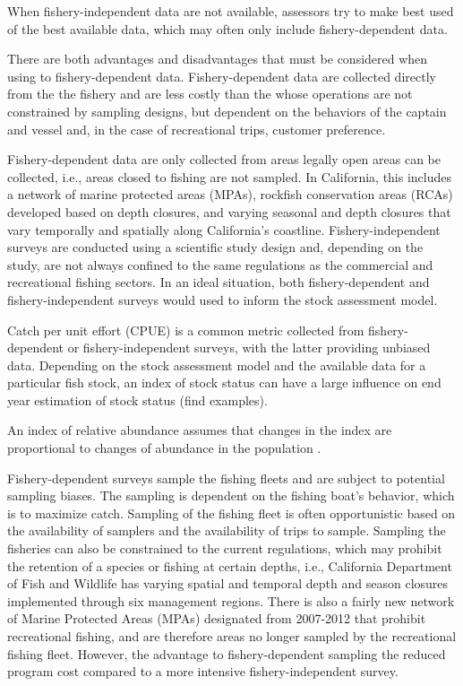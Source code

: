 \documentclass[preprint, 3p,
authoryear]{elsarticle} %
\begin{document}
When fishery-independent data are not available, assessors try to make
best used of the best available data, which may often only include
fishery-dependent data.

There are both advantages and disadvantages that must be considered when
using to fishery-dependent data. Fishery-dependent data are collected
directly from the the fishery and are less costly than the whose
operations are not constrained by sampling designs, but dependent on the
behaviors of the captain and vessel and, in the case of recreational
trips, customer preference.

Fishery-dependent data are only collected from areas legally open areas
can be collected, i.e., areas closed to fishing are not sampled. In
California, this includes a network of marine protected areas (MPAs),
rockfish conservation areas (RCAs) developed based on depth closures,
and varying seasonal and depth closures that vary temporally and
spatially along California's coastline. Fishery-independent surveys are
conducted using a scientific study design and, depending on the study,
are not always confined to the same regulations as the commercial and
recreational fishing sectors. In an ideal situation, both
fishery-dependent and fishery-independent surveys would used to inform
the stock assessment model.

Catch per unit effort (CPUE) is a common metric collected from
fishery-dependent or fishery-independent surveys, with the latter
providing unbiased data. Depending on the stock assessment model and the
available data for a particular fish stock, an index of stock status can
have a large influence on end year estimation of stock status (find
examples).

An index of relative abundance assumes that changes in the index are
proportional to changes of abundance in the population
\citep{Harley2001}.

Fishery-dependent surveys sample the fishing fleets and are subject to
potential sampling biases. The sampling is dependent on the fishing
boat's behavior, which is to maximize catch. Sampling of the fishing
fleet is often opportunistic based on the availability of samplers and
the availability of trips to sample. Sampling the fisheries can also be
constrained to the current regulations, which may prohibit the retention
of a species or fishing at certain depths, i.e., California Department
of Fish and Wildlife has varying spatial and temporal depth and season
closures implemented through six management regions. There is also a
fairly new network of Marine Protected Areas (MPAs) designated from
2007-2012 that prohibit recreational fishing, and are therefore areas no
longer sampled by the recreational fishing fleet. However, the advantage
to fishery-dependent sampling the reduced program cost compared to a
more intensive fishery-independent survey.
\end{document}
